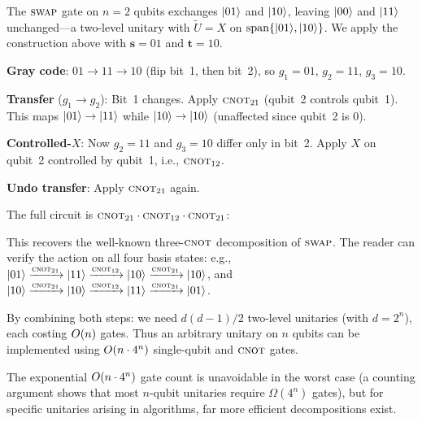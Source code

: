 \begin{example}\label{ex:swap-gray}
  The $\textsc{swap}$ gate on $n=2$ qubits exchanges $|01\rangle$ and $|10\rangle$,
  leaving $|00\rangle$ and $|11\rangle$ unchanged---a two-level unitary with
  $\widetilde{U} = X$ on $\operatorname{span}\{|01\rangle,|10\rangle\}$.  We apply the
  construction above with $\mathbf{s}=01$ and $\mathbf{t}=10$.

  \textbf{Gray code}: $01 \to 11 \to 10$ (flip bit~1, then bit~2), so
  $g_1=01$, $g_2=11$, $g_3=10$.

  \textbf{Transfer} ($g_1\to g_2$): Bit~1 changes.  Apply $\textsc{cnot}_{21}$
  (qubit~2 controls qubit~1).  This maps $|01\rangle\to|11\rangle$ while
  $|10\rangle\to|10\rangle$ (unaffected since qubit~2 is $0$).

  \textbf{Controlled-$X$}: Now $g_2=11$ and $g_3=10$ differ only in bit~2.
  Apply $X$ on qubit~2 controlled by qubit~1, i.e., $\textsc{cnot}_{12}$.

  \textbf{Undo transfer}: Apply $\textsc{cnot}_{21}$ again.

  The full circuit is $\textsc{cnot}_{21}\cdot\textsc{cnot}_{12}\cdot\textsc{cnot}_{21}$:
  \begin{center}
  \end{center}
  This recovers the well-known three-$\textsc{cnot}$ decomposition of $\textsc{swap}$.
  The reader can verify the action on all four basis states: e.g.,
  $|01\rangle\xrightarrow{\textsc{cnot}_{21}}|11\rangle
  \xrightarrow{\textsc{cnot}_{12}}|10\rangle
  \xrightarrow{\textsc{cnot}_{21}}|10\rangle$,
  and $|10\rangle\xrightarrow{\textsc{cnot}_{21}}|10\rangle
  \xrightarrow{\textsc{cnot}_{12}}|11\rangle
  \xrightarrow{\textsc{cnot}_{21}}|01\rangle$.
\end{example}

By combining both steps: we need $d(d-1)/2$ two-level unitaries (with
$d=2^n$), each costing $O\!\left(n\right)$ gates.  Thus an arbitrary unitary on $n$
qubits can be implemented using $O\!\left(n\cdot 4^n\right)$ single-qubit and $\textsc{cnot}$
gates.

\begin{remark}
  The exponential $O\!\left(n\cdot 4^n\right)$ gate count is unavoidable in the
  worst case (a counting argument shows that most $n$-qubit unitaries
  require $\Omega(4^n)$ gates), but for specific unitaries arising in
  algorithms, far more efficient decompositions exist.
\end{remark}
